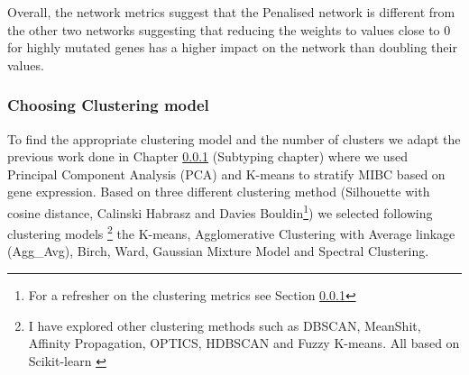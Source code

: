 Overall, the network metrics suggest that the Penalised network is different from the other two networks suggesting that reducing the weights to values close to 0 for highly mutated genes has a higher impact on the network than doubling their values.

\subsubsection{Choosing Clustering model}

To find the appropriate clustering model and the number of clusters we adapt the previous work done in Chapter \ref{} (Subtyping chapter) where we used Principal Component Analysis (PCA) and K-means to stratify MIBC based on gene expression. Based on three different clustering method (Silhouette with cosine distance, Calinski Habrasz and Davies Bouldin\footnote{For a refresher on the clustering metrics see Section \ref{}}) we selected following clustering models \footnote{I have explored other clustering methods such as DBSCAN, MeanShit, Affinity Propagation, OPTICS, HDBSCAN and Fuzzy K-means. All based on Scikit-learn \cite{Scikit-learn_undated-ax}} the K-means, Agglomerative Clustering with Average linkage (Agg\_Avg), Birch, Ward, Gaussian Mixture Model and Spectral Clustering. 

